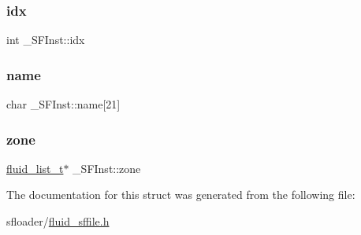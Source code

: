 \subsubsection{\texorpdfstring{idx}{idx}}
{\footnotesize\ttfamily int \+\_\+\+S\+F\+Inst\+::idx}

\mbox{\label{struct__SFInst_ac4e59433f85621bccc42ca513f2cdc9c}} 
\subsubsection{\texorpdfstring{name}{name}}
{\footnotesize\ttfamily char \+\_\+\+S\+F\+Inst\+::name\mbox{[}21\mbox{]}}

\mbox{\label{struct__SFInst_abef684a510f82942397ee1ac540724fb}} 
\subsubsection{\texorpdfstring{zone}{zone}}
{\footnotesize\ttfamily \hyperlink{fluid__list_8h_a3ef7535d4290862c0af118569223bd89}{fluid\+\_\+list\+\_\+t}$\ast$ \+\_\+\+S\+F\+Inst\+::zone}



The documentation for this struct was generated from the following file\+:\begin{DoxyCompactItemize}
\item 
sfloader/\hyperlink{fluid__sffile_8h}{fluid\+\_\+sffile.\+h}\end{DoxyCompactItemize}
